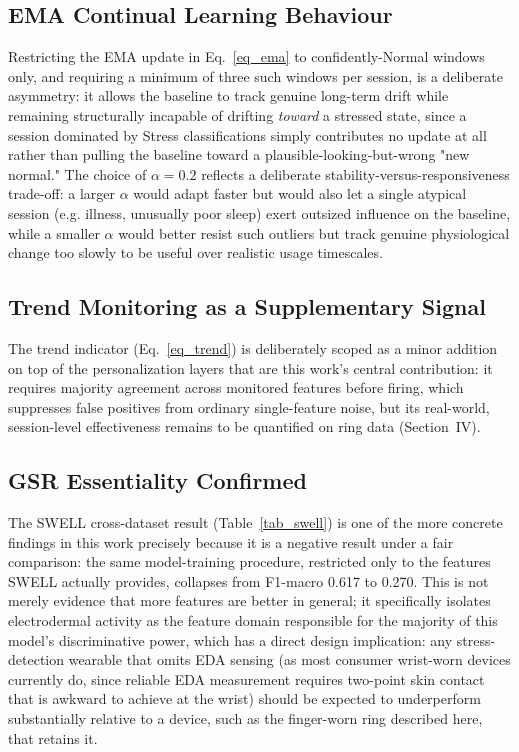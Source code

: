 \documentclass[conference]{IEEEtran}
\begin{document}
\subsection{EMA Continual Learning Behaviour}
Restricting the EMA update in Eq.~\ref{eq_ema} to
confidently-Normal windows only, and requiring a minimum of
three such windows per session, is a deliberate asymmetry: it
allows the baseline to track genuine long-term drift while
remaining structurally incapable of drifting \emph{toward} a
stressed state, since a session dominated by Stress
classifications simply contributes no update at all rather than
pulling the baseline toward a plausible-looking-but-wrong
"new normal." The choice of $\alpha = 0.2$ reflects a
deliberate stability-versus-responsiveness trade-off: a
larger $\alpha$ would adapt faster but would also let a single
atypical session (e.g. illness, unusually poor sleep) exert
outsized influence on the baseline, while a smaller $\alpha$
would better resist such outliers but track genuine
physiological change too slowly to be useful over realistic
usage timescales.

\subsection{Trend Monitoring as a Supplementary Signal}
The trend indicator (Eq.~\ref{eq_trend}) is deliberately scoped
as a minor addition on top of the personalization layers that
are this work's central contribution: it requires majority
agreement across monitored features before firing, which
suppresses false positives from ordinary single-feature noise,
but its real-world, session-level effectiveness remains to be
quantified on ring data (Section~IV).

\subsection{GSR Essentiality Confirmed}
The SWELL cross-dataset result (Table~\ref{tab_swell}) is one
of the more concrete findings in this work precisely because it
is a negative result under a fair comparison: the same
model-training procedure, restricted only to the features SWELL
actually provides, collapses from F1-macro 0.617 to 0.270. This
is not merely evidence that more features are better in
general; it specifically isolates electrodermal activity as
the feature domain responsible for the majority of this
model's discriminative power, which has a direct design
implication: any stress-detection wearable that omits EDA
sensing (as most consumer wrist-worn devices currently do, since
reliable EDA measurement requires two-point skin contact that
is awkward to achieve at the wrist) should be expected to
underperform substantially relative to a device, such as the
finger-worn ring described here, that retains it.
\end{document}
